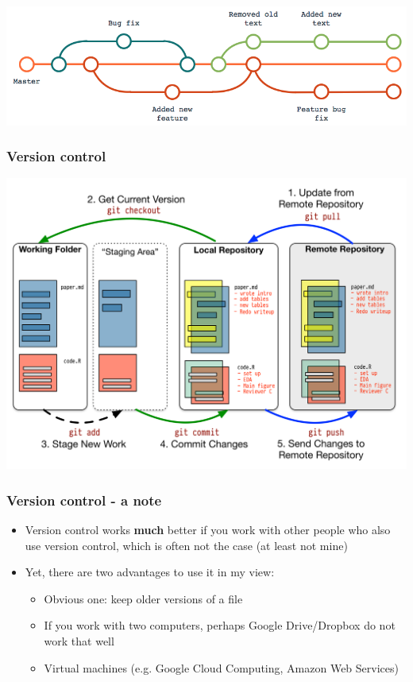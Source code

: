 \documentclass[utf8, xcolor=dvipsnames, handout]{beamer}
\begin{document}
\begin{itemize}
\begin{frame}
\includegraphics[width = \textwidth]{img/gitesquema}

\end{frame}

\begin{frame}
\frametitle{Version control}
\centering

\includegraphics[width = \textwidth]{img/git-basic}

\end{frame}

\begin{frame}
\frametitle{Version control - a note}
\centering

\begin{itemize}
  \item Version control works \textbf{much} better if you work with other people who also use version control, which is often not the case (at least not mine)
  \item Yet, there are two advantages to use it in my view:
  \begin{itemize}
    \item Obvious one: keep older versions of a file
    \item If you work with two computers, perhaps Google Drive/Dropbox do not work that well
    \item Virtual machines (e.g. Google Cloud Computing, Amazon Web Services)
  \end{itemize}
\end{itemize}


\end{frame}
\end{itemize}
\end{document}
